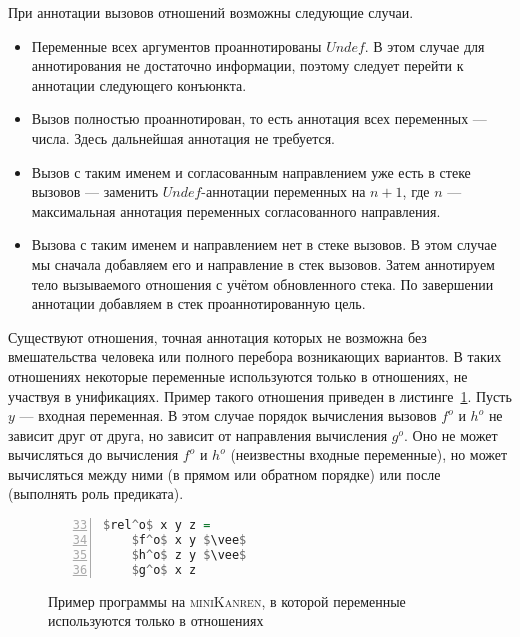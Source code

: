 \documentclass[conference,a4paper,american,russian]{IEEEtran}
\newcommand{\miniKanren}{\textsc{miniKanren}}
\begin{document}
При аннотации вызовов отношений возможны следующие случаи. 
\begin{itemize}
    \item Переменные всех аргументов проаннотированы $Undef$. В этом случае для аннотирования не достаточно информации, поэтому следует перейти к аннотации следующего конъюнкта. 
    \item Вызов полностью проаннотирован, то есть аннотация всех переменных --- числа. Здесь дальнейшая аннотация не требуется.
    \item Вызов с таким именем и согласованным направлением уже есть в стеке вызовов --- заменить $Undef$-аннотации переменных на $n+1$, где $n$ --- максимальная аннотация переменных согласованного направления.
    \item Вызова с таким именем и направлением нет в стеке вызовов.
    В этом случае мы сначала добавляем его и направление в стек вызовов. 
    Затем аннотируем тело вызываемого отношения с учётом обновленного стека. 
    По завершении аннотации добавляем в стек проаннотированную цель.
\end{itemize}

Существуют отношения, точная аннотация которых не возможна без вмешательства человека или полного перебора возникающих вариантов. 
В таких отношениях некоторые переменные используются только в отношениях, не участвуя в унификациях.
Пример такого отношения приведен в листинге~\ref{lst:reloDEF}.
Пусть $y$ --- входная переменная.
В этом случае порядок вычисления вызовов $f^o$ и $h^o$ не зависит друг от друга, но зависит от направления вычисления $g^o$.
Оно не может вычисляться до вычисления $f^o$ и $h^o$ (неизвестны входные переменные), но может вычисляться между ними (в прямом или обратном порядке) или после (выполнять роль предиката).

\begin{figure}[h!]
  \begin{center}
  \begin{minipage}{0.18\textwidth}
  \begin{lstlisting}[language=Haskell, frame=single, numbers=left,numberstyle=\small, firstnumber=33, escapechar=|]
  $rel^o$ x y z =
    $f^o$ x y $\vee$
    $h^o$ z y $\vee$
    $g^o$ x z
    \end{lstlisting}
  \end{minipage}
  \end{center}
  \caption{Пример программы на \miniKanren{}, в которой переменные используются только в отношениях}
  \label{lst:reloDEF}
\end{figure}
\end{document}
